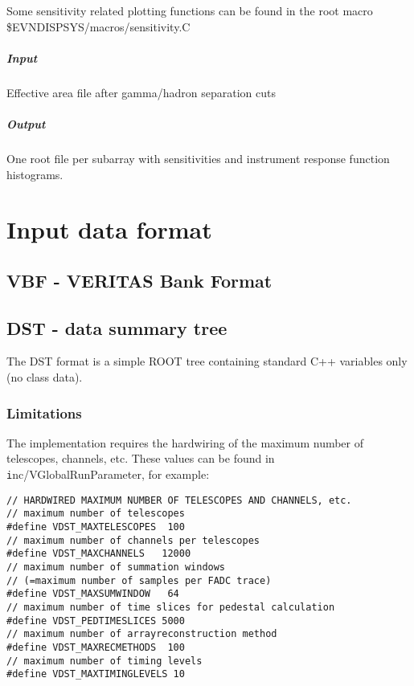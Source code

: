 \documentclass[titlepage,a4paper,twoside,11pt]{report}
\begin{document}
Some sensitivity related plotting functions can be found in the
root macro \$EVNDISPSYS/macros/sensitivity.C

\paragraph{Input}
Effective area file after gamma/hadron separation cuts

\paragraph{Output}
One root file per subarray with sensitivities and instrument response function histograms.

\chapter{Input data format}

\section{VBF - VERITAS Bank Format}

\section{DST - data summary tree}
\label{SECTION.DST}

The DST format is a simple ROOT tree containing standard C++ variables only (no class data).

\subsection{Limitations}
\label{SUBSECTION.DST.LIMITATIONS}

The implementation requires the hardwiring of the maximum number of telescopes, channels, etc. 
These values can be found in {\texttt inc/VGlobalRunParameter}, for example:

\begin{lstlisting}
// HARDWIRED MAXIMUM NUMBER OF TELESCOPES AND CHANNELS, etc.
// maximum number of telescopes
#define VDST_MAXTELESCOPES  100
// maximum number of channels per telescopes
#define VDST_MAXCHANNELS   12000
// maximum number of summation windows
// (=maximum number of samples per FADC trace)   
#define VDST_MAXSUMWINDOW   64
// maximum number of time slices for pedestal calculation
#define VDST_PEDTIMESLICES 5000   
// maximum number of arrayreconstruction method 
#define VDST_MAXRECMETHODS  100
// maximum number of timing levels
#define VDST_MAXTIMINGLEVELS 10    
\end{lstlisting}
\end{document}
